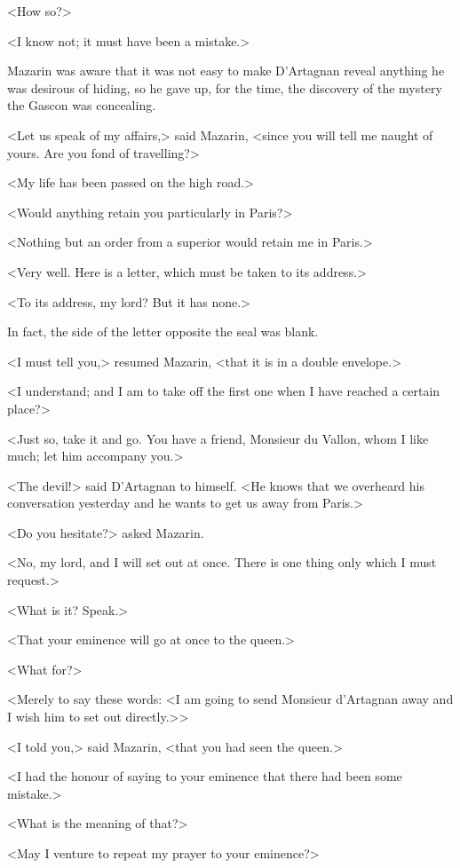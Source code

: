 <How so?>

<I know not; it must have been a mistake.>

Mazarin was aware that it was not easy to make D'Artagnan reveal anything he was desirous of hiding, so he gave up, for the time, the discovery of the mystery the Gascon was concealing.

<Let us speak of my affairs,> said Mazarin, <since you will tell me naught of yours. Are you fond of travelling?>

<My life has been passed on the high road.>

<Would anything retain you particularly in Paris?>

<Nothing but an order from a superior would retain me in Paris.>

<Very well. Here is a letter, which must be taken to its address.>

<To its address, my lord? But it has none.>

In fact, the side of the letter opposite the seal was blank.

<I must tell you,> resumed Mazarin, <that it is in a double envelope.>

<I understand; and I am to take off the first one when I have reached a certain place?>

<Just so, take it and go. You have a friend, Monsieur du Vallon, whom I like much; let him accompany you.>

<The devil!> said D'Artagnan to himself. <He knows that we overheard his conversation yesterday and he wants to get us away from Paris.>

<Do you hesitate?> asked Mazarin.

<No, my lord, and I will set out at once. There is one thing only which I must request.>

<What is it? Speak.>

<That your eminence will go at once to the queen.>

<What for?>

<Merely to say these words: <I am going to send Monsieur d'Artagnan away and I wish him to set out directly.>>

<I told you,> said Mazarin, <that you had seen the queen.>

<I had the honour of saying to your eminence that there had been some mistake.>

<What is the meaning of that?>

<May I venture to repeat my prayer to your eminence?>

